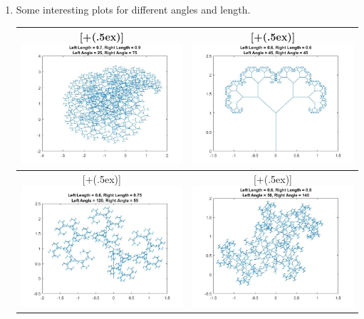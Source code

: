 \documentclass[11pt,a4paper]{article}
\newcommand*{\addheight}[2][.5ex]{%
  \raisebox{0pt}[\dimexpr\height+(#1)\relax]{#2}%
}
\begin{document}
\begin{enumerate}[label=(\alph*)]
\item
Some interesting plots for different angles and length.\\
\begin{minipage}{\linewidth}
{
\begin{table}[H]
\centering
\begin{tabular}{|c|c|}
	\hline
	\addheight{\includegraphics[width=75mm]{images/prob3d1.jpg}} &
    \addheight{\includegraphics[width=75mm]{images/prob3d2.jpg}} \\
    \hline
    \addheight{\includegraphics[width=75mm]{images/prob3d3.jpg}} &
    \addheight{\includegraphics[width=75mm]{images/prob3d4.jpg}} \\
	\hline
\end{tabular}
\end{table}
}
\end{minipage}
\end{enumerate}
\end{document}
